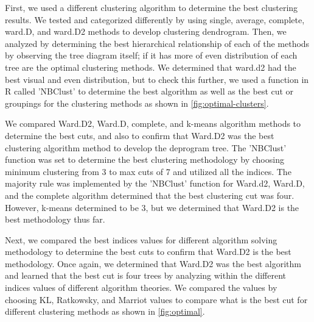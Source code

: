 \documentclass[10pt,twoside]{article}
\numberwithin{equation}{section}
\newcommand{\?}{\stackrel{?}{=}}
\begin{document}
First, we used a different clustering algorithm to determine the best clustering results. We tested and categorized differently by using single, average, complete, ward.D, and ward.D2 methods to develop clustering dendrogram. Then, we analyzed by determining the best hierarchical relationship of each of the methods by observing the tree diagram itself; if it has more of even distribution of each tree are the optimal clustering methods. We determined that ward.d2 had the best visual and even distribution, but to check this further, we used a function in R called 'NBClust' to determine the best algorithm as well as the best cut or groupings for the clustering methods as shown in \autoref{fig:optimal-clusters}. 

We compared Ward.D2, Ward.D, complete, and k-means algorithm methods to determine the best cuts, and also to confirm that Ward.D2 was the best clustering algorithm method to develop the deprogram tree. The 'NBClust' function was set to determine the best clustering methodology by choosing minimum clustering from 3 to max cuts of 7 and utilized all the indices.  The majority rule was implemented by the 'NBClust' function for Ward.d2, Ward.D, and the complete algorithm determined that the best clustering cut was four. However, k-means determined to be 3, but we determined that Ward.D2 is the best methodology thus far. 

Next, we compared the best indices values for different algorithm solving methodology to determine the best cuts to confirm that Ward.D2 is the best methodology. Once again, we determined that Ward.D2 was the best algorithm and learned that the best cut is four trees by analyzing within the different indices values of different algorithm theories. We compared the values by choosing KL, Ratkowsky, and Marriot values to compare what is the best cut for different clustering methods as shown in \autoref{fig:optimal}. 
\end{document}
